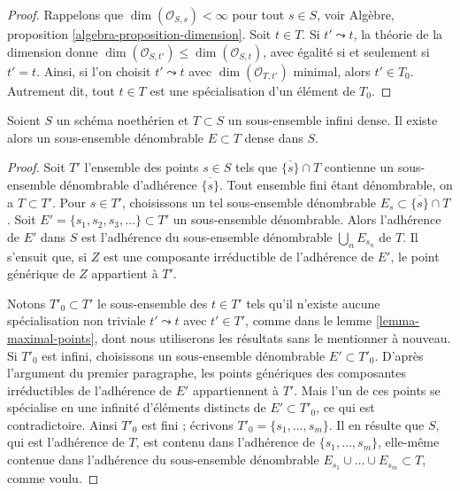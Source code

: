 \begin{proof}
Rappelons que $\dim(\mathcal{O}_{S, s}) < \infty$ pour tout $s \in S$, voir
Algèbre, proposition \ref{algebra-proposition-dimension}. Soit $t \in T$.
Si $t' \leadsto t$, la théorie de la dimension donne
$\dim(\mathcal{O}_{S, t'}) \leq \dim(\mathcal{O}_{S, t})$,
avec égalité si et seulement si $t' = t$. Ainsi, si l'on choisit $t' \leadsto t$
avec $\dim(\mathcal{O}_{T, t'})$ minimal, alors $t' \in T_0$.
Autrement dit,
tout $t \in T$ est une spécialisation d'un élément de $T_0$.
\end{proof}

\begin{lemma}
\label{lemma-countable-dense-subset}
Soient $S$ un schéma noethérien et $T \subset S$ un sous-ensemble infini dense.
Il existe alors un sous-ensemble dénombrable $E \subset T$ dense dans $S$.
\end{lemma}

\begin{proof}
Soit $T'$ l'ensemble des points $s \in S$ tels que $\overline{\{s\}} \cap T$
contienne un sous-ensemble dénombrable d'adhérence $\overline{\{s\}}$.
Tout ensemble fini étant dénombrable, on a $T \subset T'$.
Pour $s \in T'$, choisissons un tel sous-ensemble dénombrable
$E_s \subset \overline{\{s\}} \cap T$.
Soit $E' = \{s_1, s_2, s_3, \ldots\} \subset T'$
un sous-ensemble dénombrable. Alors l'adhérence de $E'$ dans $S$ est
l'adhérence du sous-ensemble dénombrable $\bigcup_n E_{s_n}$ de $T$.
Il s'ensuit que, si $Z$
est une composante irréductible de l'adhérence de $E'$, le point
générique de $Z$ appartient à $T'$.

\medskip\noindent
Notons $T'_0 \subset T'$ le sous-ensemble des $t \in T'$ tels
qu'il n'existe aucune spécialisation non triviale $t' \leadsto t$ avec $t' \in T'$,
comme dans le lemme \ref{lemma-maximal-points}, dont nous utiliserons les résultats
sans le mentionner à nouveau. Si $T'_0$ est infini, choisissons un
sous-ensemble dénombrable $E' \subset T'_0$. D'après l'argument du premier
paragraphe, les points génériques des composantes irréductibles de
l'adhérence de $E'$ appartiennent à $T'$. Mais l'un de ces points se spécialise en
une infinité d'éléments distincts de $E' \subset T'_0$,
ce qui est contradictoire. Ainsi $T'_0$ est fini ; écrivons
$T'_0 = \{s_1, \ldots, s_m\}$. Il en résulte que $S$, qui est
l'adhérence de $T$, est contenu dans l'adhérence de
$\{s_1, \ldots, s_m\}$, elle-même contenue dans l'adhérence
du sous-ensemble dénombrable $E_{s_1} \cup \ldots \cup E_{s_m} \subset T$,
comme voulu.
\end{proof}
